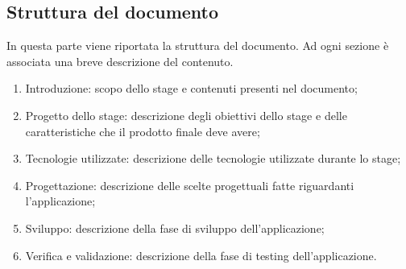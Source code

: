 \documentclass[../Tesi.tex]{subfiles}
\begin{document}
	\subsection{Struttura del documento}
		In questa parte viene riportata la struttura del documento. Ad ogni sezione è associata una breve descrizione del contenuto.
		\begin{enumerate}
			\item Introduzione: scopo dello stage e contenuti presenti nel documento;
			\item Progetto dello stage: descrizione degli obiettivi dello stage e delle caratteristiche che il prodotto finale deve avere;
			\item Tecnologie utilizzate: descrizione delle tecnologie utilizzate durante lo stage;
			\item Progettazione: descrizione delle scelte progettuali fatte riguardanti l'applicazione;
			\item Sviluppo: descrizione della fase di sviluppo dell'applicazione;
			\item Verifica e validazione: descrizione della fase di testing dell'applicazione.
		\end{enumerate}
\end{document}
